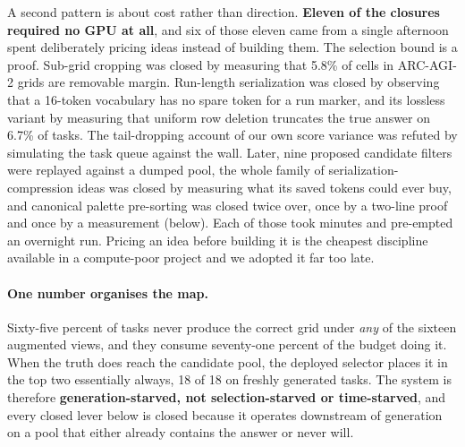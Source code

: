 \documentclass[11pt]{article}
\begin{document}
A second pattern is about cost rather than direction. \textbf{Eleven of the closures required no GPU
at all}, and six of those eleven came from a single afternoon spent deliberately pricing ideas
instead of building them. The selection bound is a proof. Sub-grid cropping was closed by measuring
that 5.8\% of cells in ARC-AGI-2 grids are removable margin. Run-length serialization was closed by
observing that a 16-token vocabulary has no spare token for a run marker, and its lossless variant by
measuring that uniform row deletion truncates the true answer on 6.7\% of tasks. The tail-dropping
account of our own score variance was refuted by simulating the task queue against the wall. Later,
nine proposed candidate filters were replayed against a dumped pool, the whole family of
serialization-compression ideas was closed by measuring what its saved tokens could ever buy, and
canonical palette pre-sorting was closed twice over, once by a two-line proof and once by a
measurement (below). Each of those took minutes and pre-empted an overnight run. Pricing an idea
before building it is the cheapest discipline available in a compute-poor project and we adopted it
far too late.

\paragraph{One number organises the map.} Sixty-five percent of tasks never produce the correct grid
under \emph{any} of the sixteen augmented views, and they consume seventy-one percent of the budget
doing it. When the truth does reach the candidate pool, the deployed selector places it in the top two
essentially always, 18 of 18 on freshly generated tasks. The system is therefore
\textbf{generation-starved, not selection-starved or time-starved}, and every closed lever below is
closed because it operates downstream of generation on a pool that either already contains the answer
or never will.
\end{document}

